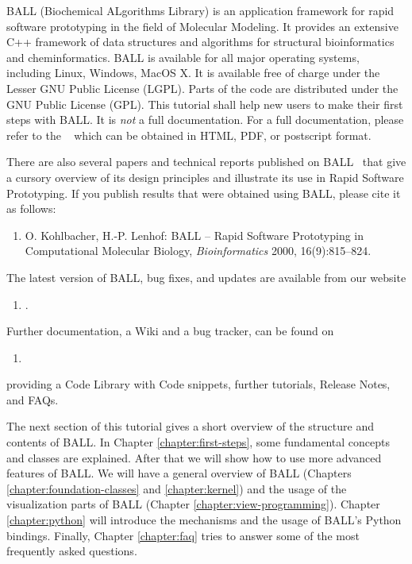 \noindent
BALL (Biochemical ALgorithms Library) is an application framework for rapid
software prototyping in the field of Molecular Modeling.
It provides an extensive C++ framework of data structures and algorithms for
structural bioinformatics and cheminformatics.
BALL is available for all major operating systems, including Linux, Windows, MacOS X.
It is available free of charge under the Lesser GNU Public License (LGPL).
Parts of the code are distributed under the GNU Public License (GPL).
This tutorial shall help new users to make their first steps with BALL.
It is {\em not} a full documentation. For a full documentation, please refer to the ~\cite{BALL-RM} which can be obtained in HTML, PDF, or postscript format.

There are also several papers and technical reports published on
BALL~\cite{BKL99a,BKL99b,KL99,Koh2001,KL2000,MHLK05,MHLK06}
that give a cursory overview of its design principles and illustrate its use in
Rapid Software Prototyping. If you publish results that were obtained using 
BALL, please cite it as follows:
\begin{enumerate}
  \item[] O. Kohlbacher, H.-P. Lenhof: BALL -- Rapid Software Prototyping
          in Computational Molecular Biology, {\em Bioinformatics} 2000,
          16(9):815--824.
\end{enumerate}

\noindent
The latest version of BALL, bug fixes, and updates are available from our 
website

\begin{enumerate}
  \item[] .
\end{enumerate}

\noindent
Further documentation, a Wiki and a bug tracker, can be found on 

\begin{enumerate}
  \item[] 
\end{enumerate}
providing a Code Library with Code snippets, further tutorials, Release Notes, and FAQs.


The next section of this tutorial gives a short overview of the structure and
contents of BALL. In Chapter \ref{chapter:first-steps}, some
fundamental concepts and classes are explained. After that we will show how to
use more advanced features of BALL. We will have a general overview of BALL 
 (Chapters \ref{chapter:foundation-classes} and  \ref{chapter:kernel}) 
and the usage of the visualization parts of BALL (Chapter \ref{chapter:view-programming}). 
Chapter \ref{chapter:python} will introduce the mechanisms and the usage of
BALL's Python bindings.  Finally, Chapter
\ref{chapter:faq} tries to answer some of the most frequently asked questions.

